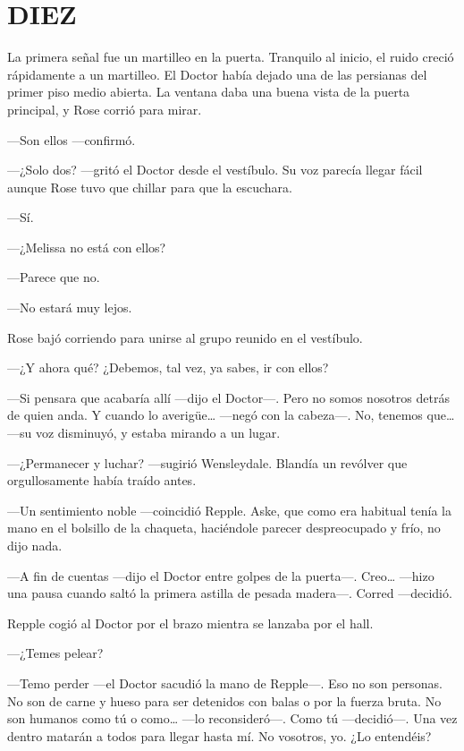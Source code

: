\chapter*{DIEZ}

{La primera señal fue un martilleo en la puerta. Tranquilo al inicio, el
	ruido creció rápidamente a un martilleo. El Doctor había dejado una de
	las persianas del primer piso medio abierta. La ventana daba una buena
vista de la puerta principal, y Rose corrió para mirar.}

{---Son ellos ---confirmó.}

{---¿Solo dos? ---gritó el Doctor desde el vestíbulo. Su voz parecía
llegar fácil aunque Rose tuvo que chillar para que la escuchara.}

{---Sí.}

{---¿Melissa no está con ellos?}

{---Parece que no.}

{---No estará muy lejos.}

{Rose bajó corriendo para unirse al grupo reunido en el vestíbulo. }

{---¿Y ahora qué? ¿Debemos, tal vez, ya sabes, ir con ellos?}

{---Si pensara que acabaría allí ---dijo el Doctor---. Pero no somos
	nosotros detrás de quien anda. Y cuando lo averigüe\ldots{} ---negó con
	la cabeza---. No, tenemos que\ldots{} ---su voz disminuyó, y estaba
mirando a un lugar.}

{---¿Permanecer y luchar? ---sugirió Wensleydale. Blandía un revólver
que orgullosamente había traído antes.}

{---Un sentimiento noble ---coincidió Repple. Aske, que como era
	habitual tenía la mano en el bolsillo de la chaqueta, haciéndole parecer
despreocupado y frío, no dijo nada.}

{---A fin de cuentas ---dijo el Doctor entre golpes de la puerta---.
	Creo\ldots{} ---hizo una pausa cuando saltó la primera astilla de pesada
madera---. Corred ---decidió.}

{Repple cogió al Doctor por el brazo mientra se lanzaba por el hall. }

{---¿Temes pelear?}

{---Temo perder ---el Doctor sacudió la mano de Repple---. Eso no son
	personas. No son de carne y hueso para ser detenidos con balas o por la
	fuerza bruta. No son humanos como tú o como\ldots{} ---lo
	reconsideró---. Como tú ---decidió---. Una vez dentro matarán a todos
para llegar hasta mí. No vosotros, yo. ¿Lo entendéis?}

